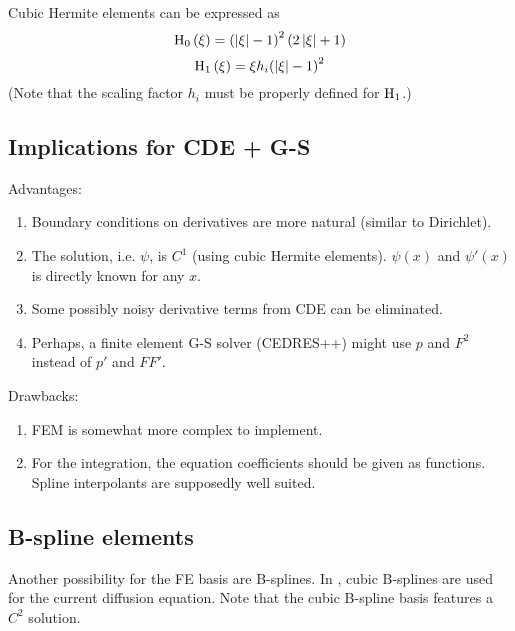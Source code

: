 Cubic Hermite elements can be expressed as
\begin{equation}
{{\rm H}_0}\left( \xi  \right) = {\left( {\left| \xi  \right| - 1} \right)^2}\left( {2\left| \xi  \right| + 1} \right)
\end{equation}
\begin{equation}
{{\rm H}_1}\left( \xi  \right) = \xi {h_i}{\left( {\left| \xi  \right| - 1} \right)^2}
\end{equation}
(Note that the scaling factor $h_i$ must be properly defined for
${\rm H}_1$.)



\subsection{Implications for CDE + G-S}

Advantages:
\begin{enumerate}
	\item Boundary conditions on derivatives are more natural (similar to Dirichlet).
	\item The solution, i.e. $\psi$, is $C^1$ (using cubic Hermite elements). 
	$\psi\left( x\right)$ and $\psi'\left( x\right)$ is directly known for any $x$.
	\item Some possibly noisy derivative terms from CDE can be eliminated.
	\item Perhaps, a finite element G-S solver (CEDRES++) might use $p$ and $F^2$ instead of $p'$ and $FF'$.
\end{enumerate}
Drawbacks:
\begin{enumerate}
	\item FEM is somewhat more complex to implement.
	\item For the integration, the equation coefficients should be given as functions. Spline interpolants are supposedly well suited.
\end{enumerate}

\subsection{B-spline elements}
Another possibility for the FE basis are B-splines.
In \cite{Felici2011}, cubic B-splines are used for the current diffusion equation.
Note that the cubic B-spline basis features a $C^2$ solution.
